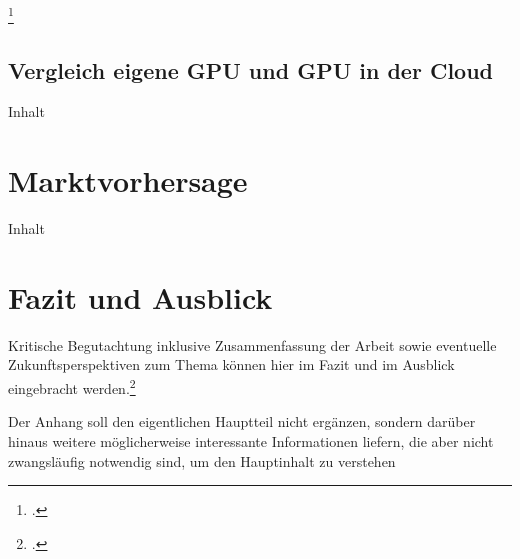\documentclass[12pt,toc=bib,toc=listof]{scrreprt}
\newcounter{savepage}
\begin{document}
\footcite [] [] {Loop.2006}

\section{Vergleich eigene GPU und GPU in der Cloud}
\label{sec:Vergleich eigene GPU und GPU in der Cloud}

Inhalt

\chapter{Marktvorhersage}
\label{sec:Marktvorhersage}

Inhalt

\chapter{Fazit und Ausblick} %
\label{sec:fazit}

Kritische Begutachtung inklusive Zusammenfassung der Arbeit sowie eventuelle Zukunftsperspektiven zum Thema können hier im Fazit und im Ausblick eingebracht werden.\footcite [Vgl.] [] {HAN2016S30}


\appendix
\newpage

\setcounter{page}{\thesavepage}

\label{sec:anhang}

Der Anhang soll den eigentlichen Hauptteil nicht ergänzen, sondern darüber hinaus weitere möglicherweise interessante Informationen liefern, die aber nicht zwangsläufig notwendig sind, um den Hauptinhalt zu verstehen

\newpage

\printbibliography[heading=head]



\newpage
\end{document}
